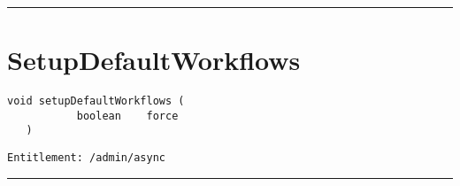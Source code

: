 \rule{12cm}{2pt}
\section{SetupDefaultWorkflows}
\label{Api:SetupDefaultWorkflows}
\begin{lstlisting}[style=nonumbers]
   void setupDefaultWorkflows (
           boolean    force
   )
\end{lstlisting}
\begin{Verbatim}[formatcom=\color{Maroon}]
  Entitlement: /admin/async
\end{Verbatim}



\rule{12cm}{2pt}
